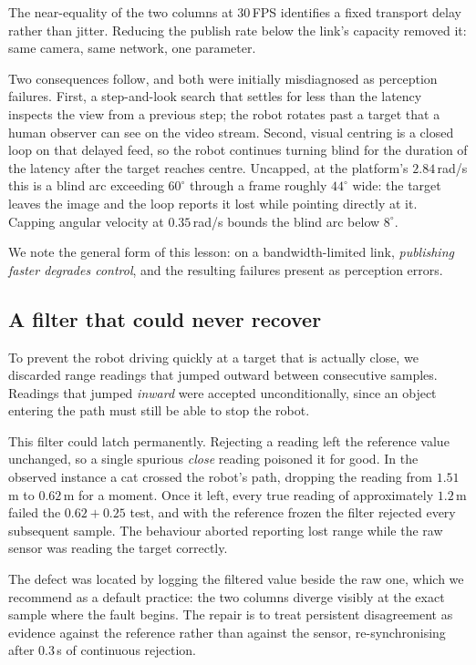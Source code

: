 \documentclass[conference]{IEEEtran}
\begin{document}
The near-equality of the two columns at $30$\,FPS identifies a fixed transport
delay rather than jitter. Reducing the publish rate below the link's capacity
removed it: same camera, same network, one parameter.

Two consequences follow, and both were initially misdiagnosed as perception
failures. First, a step-and-look search that settles for less than the latency
inspects the view from a previous step; the robot rotates past a target that a
human observer can see on the video stream. Second, visual centring is a closed
loop on that delayed feed, so the robot continues turning blind for the duration
of the latency after the target reaches centre. Uncapped, at the platform's
$2.84$\,rad/s this is a blind arc exceeding $60^\circ$ through a frame roughly
$44^\circ$ wide: the target leaves the image and the loop reports it lost while
pointing directly at it. Capping angular velocity at $0.35$\,rad/s bounds the
blind arc below $8^\circ$.

We note the general form of this lesson: on a bandwidth-limited link,
\emph{publishing faster degrades control}, and the resulting failures present as
perception errors.

\subsection{A filter that could never recover}

To prevent the robot driving quickly at a target that is actually close, we
discarded range readings that jumped outward between consecutive samples.
Readings that jumped \emph{inward} were accepted unconditionally, since an
object entering the path must still be able to stop the robot.

This filter could latch permanently. Rejecting a reading left the reference
value unchanged, so a single spurious \emph{close} reading poisoned it for good.
In the observed instance a cat crossed the robot's path, dropping the reading
from $1.51$\,m to $0.62$\,m for a moment. Once it left, every true reading of
approximately $1.2$\,m failed the $0.62 + 0.25$ test, and with the reference
frozen the filter rejected every subsequent sample. The behaviour aborted
reporting lost range while the raw sensor was reading the target correctly.

The defect was located by logging the filtered value beside the raw one, which
we recommend as a default practice: the two columns diverge visibly at the exact
sample where the fault begins. The repair is to treat persistent disagreement as
evidence against the reference rather than against the sensor, re-synchronising
after $0.3$\,s of continuous rejection.
\end{document}
